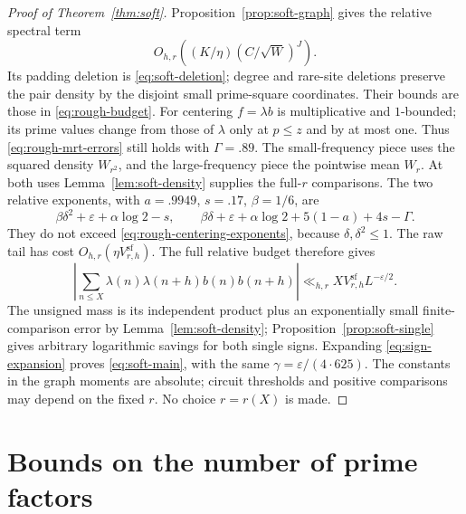 \documentclass[11pt]{article}
\theoremstyle{definition}
\theoremstyle{remark}
\numberwithin{equation}{section}
\newcommand{\eps}{\varepsilon}
\newcommand{\sfw}{\mathrm{sf}}
\begin{document}
\begin{proof}[Proof of Theorem~\ref{thm:soft}]
Proposition~\ref{prop:soft-graph} gives the relative spectral term
\begin{equation}\label{eq:soft-spectral}
 O_{h,r}((K/\eta)(C/\sqrt W)^J).
\end{equation}
Its padding deletion is \eqref{eq:soft-deletion}; degree and rare-site deletions preserve the pair density by the
disjoint small prime-square coordinates. Their bounds are those in \eqref{eq:rough-budget}.
For centering $f=\lambda b$ is multiplicative and $1$-bounded; its prime values change from those of $\lambda$
only at $p\le z$ and by at most one. Thus \eqref{eq:rough-mrt-errors} still holds with $\Gamma=.89$.
The small-frequency piece uses the squared density $W_{r^2}$, and the large-frequency piece the pointwise mean
$W_r$. At both uses Lemma~\ref{lem:soft-density} supplies the full-$r$ comparisons.
The two relative exponents, with $a=.9949$, $s=.17$, $\beta=1/6$, are
\begin{equation}\label{eq:soft-centering-exponents}
 \beta\delta^2+\eps+\alpha\log2-s,\qquad
 \beta\delta+\eps+\alpha\log2+5(1-a)+4s-\Gamma.
\end{equation}
They do not exceed \eqref{eq:rough-centering-exponents}, because $\delta,\delta^2\le1$.
The raw tail has cost $O_{h,r}(\eta V^{\sfw}_{r,h})$.
The full relative budget therefore gives
\begin{equation}\label{eq:soft-joint}
 \left|\sum_{n\le X}\lambda(n)\lambda(n+h)b(n)b(n+h)\right|
 \ll_{h,r}XV^{\sfw}_{r,h}L^{-\eps/2}.
\end{equation}
The unsigned mass is its independent product plus an exponentially small finite-comparison error by
Lemma~\ref{lem:soft-density}; Proposition~\ref{prop:soft-single} gives arbitrary logarithmic savings for both
single signs. Expanding \eqref{eq:sign-expansion} proves \eqref{eq:soft-main}, with the same
$\gamma=\eps/(4\cdot625)$. The constants in the graph moments are absolute; circuit thresholds and positive
comparisons may depend on the fixed $r$. No choice $r=r(X)$ is made.
\end{proof}

\section{Bounds on the number of prime factors}\label{sec:consumer}
\end{document}
